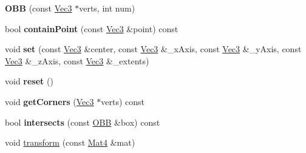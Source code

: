 \begin{DoxyCompactItemize}
{\bfseries O\+BB} (const \hyperlink{classVec3}{Vec3} $\ast$verts, int num)
\item 
\mbox{\label{classOBB_a516fbb05199b8dd3ed82bc2a1497702b}} 
bool {\bfseries contain\+Point} (const \hyperlink{classVec3}{Vec3} \&point) const
\item 
\mbox{\label{classOBB_ae044e3ae729477346252e34b858be368}} 
void {\bfseries set} (const \hyperlink{classVec3}{Vec3} \&center, const \hyperlink{classVec3}{Vec3} \&\+\_\+x\+Axis, const \hyperlink{classVec3}{Vec3} \&\+\_\+y\+Axis, const \hyperlink{classVec3}{Vec3} \&\+\_\+z\+Axis, const \hyperlink{classVec3}{Vec3} \&\+\_\+extents)
\item 
\mbox{\label{classOBB_ae7bbc7ac460611a00e531a7c5832f352}} 
void {\bfseries reset} ()
\item 
\mbox{\label{classOBB_a195a8fcbcd765a5c2d546be1db7fede7}} 
void {\bfseries get\+Corners} (\hyperlink{classVec3}{Vec3} $\ast$verts) const
\item 
\mbox{\label{classOBB_a10d5595d178edbde5d0e96968f1148d0}} 
bool {\bfseries intersects} (const \hyperlink{classOBB}{O\+BB} \&box) const
\item 
void \hyperlink{classOBB_ad62eb091e1ad05d6b9b196f4bb4d94b7}{transform} (const \hyperlink{classMat4}{Mat4} \&mat)
\end{DoxyCompactItemize}
